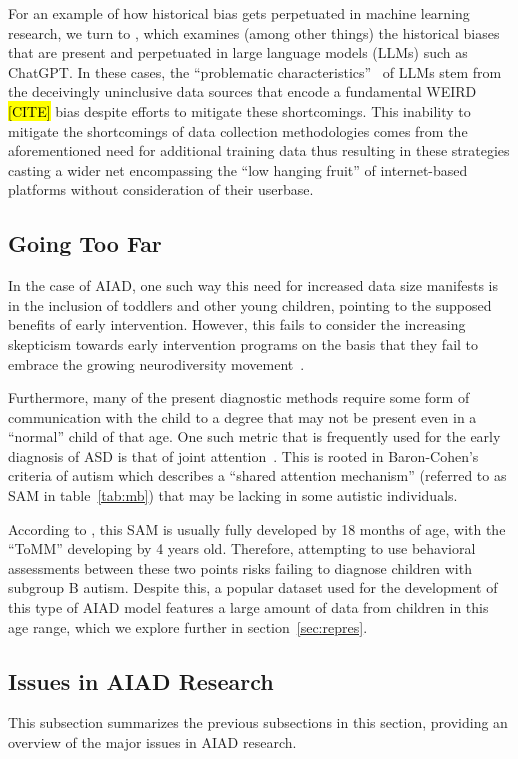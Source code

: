 \documentclass[letterpaper]{article}
\begin{document}
For an example of how historical bias gets perpetuated in machine learning research, we turn to \cite{stopar}, which examines (among other things) the historical biases that are present and perpetuated in large language models (LLMs) such as ChatGPT. In these cases, the ``problematic characteristics''~\cite[p.~613]{stopar} of LLMs stem from the deceivingly uninclusive data sources that encode a fundamental WEIRD \hl{[CITE]} bias despite efforts to mitigate these shortcomings. This inability to mitigate the shortcomings of data collection methodologies comes from the aforementioned need for additional training data thus resulting in these strategies casting a wider net encompassing the ``low hanging fruit'' of internet-based platforms without consideration of their userbase.

\subsection{Going Too Far}
In the case of AIAD, one such way this need for increased data size manifests is in the inclusion of toddlers and other young children, pointing to the supposed benefits of early intervention. However, this fails to consider the increasing skepticism towards early intervention programs on the basis that they fail to embrace the growing neurodiversity movement~\cite{crossroads}.

Furthermore, many of the present diagnostic methods require some form of communication with the child to a degree that may not be present even in a ``normal'' child of that age. One such metric that is frequently used for the early diagnosis of ASD is that of joint attention~\cite{kodak}. This is rooted in Baron-Cohen's criteria of autism which describes a ``shared attention mechanism'' (referred to as SAM in table~\ref{tab:mb}) that may be lacking in some autistic individuals.

According to \cite{mb}, this SAM is usually fully developed by 18 months of age, with the ``ToMM'' developing by 4 years old. Therefore, attempting to use behavioral assessments between these two points risks failing to diagnose children with subgroup B autism. Despite this, a popular dataset used for the development of this type of AIAD model features a large amount of data from children in this age range, which we explore further in section~\ref{sec:repres}.

\subsection{Issues in AIAD Research}
This subsection summarizes the previous subsections in this section, providing an overview of the major issues in AIAD research. 
\end{document}
